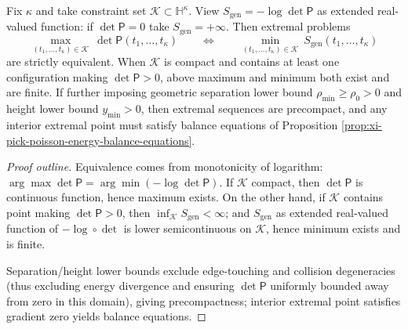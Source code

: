 \begin{proposition}\label{prop:xi-pick-poisson-weighted-fekete-variational}
Fix \(\kappa\) and take constraint set \(\mathcal{K}\subset\mathbb{H}^{\kappa}\).
View \(S_{\mathrm{gen}}=-\log\det\mathsf P\) as extended real-valued function: if \(\det\mathsf P=0\) take \(S_{\mathrm{gen}}=+\infty\).
Then extremal problems
\[
\max_{(t_1,\dots,t_\kappa)\in\mathcal{K}}\ \det\mathsf P(t_1,\dots,t_\kappa)
\qquad\Longleftrightarrow\qquad
\min_{(t_1,\dots,t_\kappa)\in\mathcal{K}}\ S_{\mathrm{gen}}(t_1,\dots,t_\kappa)
\]
are strictly equivalent.
When \(\mathcal{K}\) is compact and contains at least one configuration making \(\det\mathsf P>0\), above maximum and minimum both exist and are finite.
If further imposing geometric separation lower bound \(\rho_{\min}\ge\rho_0>0\) and height lower bound \(y_{\min}>0\), then extremal sequences are precompact, and any interior extremal point must satisfy balance equations of Proposition \ref{prop:xi-pick-poisson-energy-balance-equations}.
\end{proposition}
\begin{proof}[Proof outline]
Equivalence comes from monotonicity of logarithm:
\(
\arg\max\det\mathsf P=\arg\min(-\log\det\mathsf P)
\).
If \(\mathcal{K}\) compact, then \(\det\mathsf P\) is continuous function, hence maximum exists.
On the other hand, if \(\mathcal{K}\) contains point making \(\det\mathsf P>0\), then \(\inf_{\mathcal{K}}S_{\mathrm{gen}}<\infty\);
and \(S_{\mathrm{gen}}\) as extended real-valued function of \(-\log\circ\det\) is lower semicontinuous on \(\mathcal{K}\), hence minimum exists and is finite.
\par
Separation/height lower bounds exclude edge-touching and collision degeneracies (thus excluding energy divergence and ensuring \(\det\mathsf P\) uniformly bounded away from zero in this domain), giving precompactness; interior extremal point satisfies gradient zero yields balance equations.
\end{proof}

